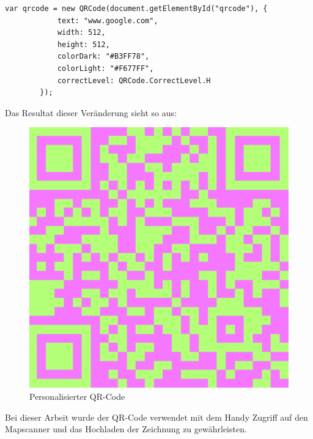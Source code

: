\begin{lstlisting}[language=html,caption=QR-Code Demo 2,label=lst:tech:gaussianBlur]
    var qrcode = new QRCode(document.getElementById("qrcode"), {
            text: "www.google.com",
            width: 512,
            height: 512,
            colorDark: "#B3FF78",
            colorLight: "#F677FF",
            correctLevel: QRCode.CorrectLevel.H
        });
\end{lstlisting}
Das Resultat dieser Veränderung sieht so aus:
\begin{figure}[H]
  \centering
  \includegraphics[scale=0.7]{pics/fancyQR.png}
  \caption{Personalisierter QR-Code}
  \label{fig:tech:persQR}
\end{figure}

Bei dieser Arbeit wurde der QR-Code verwendet mit dem Handy Zugriff auf den Mapscanner und
das Hochladen der Zeichnung zu gewährleisten.

